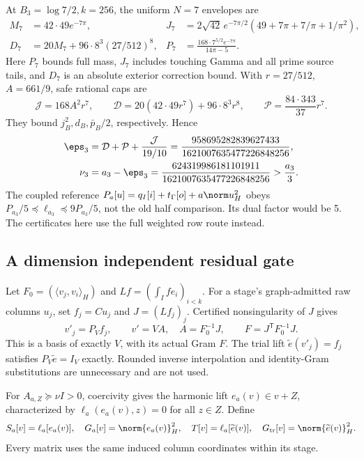 \documentclass[11pt,a4paper]{article}
\numberwithin{equation}{section}
\theoremstyle{definition}\newtheorem{definition}[theorem]{Definition}
\theoremstyle{remark}\newtheorem{remark}[theorem]{Remark}
\newcommand{\rhip}[2]{\langle#1,#2\rangle_H}
\begin{document}
At \(B_3=\log7/2,k=256\), the uniform \(N=7\) envelopes are
\begin{align*}
M_7&=42\cdot49e^{-7\pi},&
J_7&=2\sqrt{42}\,e^{-7\pi/2}(49+7\pi+7/\pi+1/\pi^2),\\
D_7&=20M_7+96\cdot8^3(27/512)^8,&
P_7&=\frac{168\cdot7^{5/2}e^{-7\pi}}{14\pi-5}.
\end{align*}
Here \(P_7\) bounds full mass, \(J_7\) includes touching Gamma and all prime
source tails, and \(D_7\) is an absolute exterior correction bound.
With \(r=27/512\), \(A=661/9\), safe rational caps are
\[
\mathcal J=168A^2r^7,\qquad
\mathcal D=20(42\cdot49r^7)+96\cdot8^3r^8,\qquad
\mathcal P=\frac{84\cdot343}{37}r^7.
\]
They bound \(j_B^2,d_B,\bar p_B/2\), respectively. Hence
\begin{align*}
\eps_3&=\mathcal D+\mathcal P+\frac{\mathcal J}{19/10}
 =\frac{958695282839627433}{1621007635477226848256},\\
\nu_3&=a_3-\eps_3=\frac{624319986181101911}{1621007635477226848256}
 >\frac{a_3}{3}.
\end{align*}
The coupled reference \(P_a[u]=q_I[i]+t_\Gamma[o]+a\norm u_H^2\) obeys
\(P_{a_3}/5\preceq\ell_{a_3}\preceq9P_{a_3}/5\), not the old half
comparison. Its dual factor would be 5. The certificates here use the
full weighted row route instead.


\subsection{A dimension independent residual gate}\label{vrg:sec:gate}
Let \(F_0=(\rhip{v_j}{v_i})\) and \(Lf=(\int_Ife_i)_{i<k}\).
For a stage's graph-admitted raw columns \(u_j\), set \(f_j=Cu_j\) and
\(J=(Lf_j)_j\). Certified nonsingularity of \(J\) gives
\[
v'_j=P_Vf_j,\qquad v'=VA,\quad A=F_0^{-1}J,\qquad
F=J^{\mathsf T}F_0^{-1}J.
\]
This is a basis of exactly \(V\), with its actual Gram \(F\).
The trial lift \(\widetilde e(v'_j)=f_j\) satisfies
\(P_V\widetilde e=I_V\) exactly. Rounded inverse interpolation and
identity-Gram substitutions are unnecessary and are not used.

For \(A_{a,Z}\succeq\nu I>0\), coercivity gives the harmonic lift
\(e_a(v)\in v+Z\), characterized by \(\ell_a(e_a(v),z)=0\) for all \(z\in Z\).
Define
\[
S_a[v]=\ell_a[e_a(v)],\quad G_a[v]=\norm{e_a(v)}_H^2,\quad
T[v]=\ell_a[\widetilde e(v)],\quad G_{\rm tr}[v]=\norm{\widetilde e(v)}_H^2.
\]
Every matrix uses the same induced column coordinates within its stage.
\end{document}
